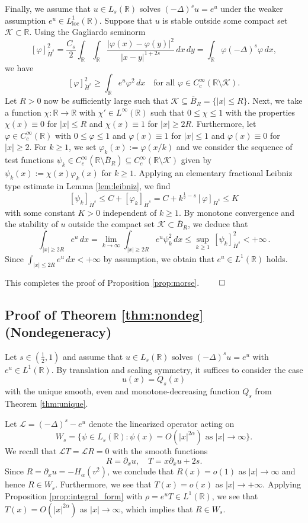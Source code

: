 \documentclass[reqno,10pt,a4paper]{amsart}
\theoremstyle{definition}
\theoremstyle{definition}
\theoremstyle{remark}
\theoremstyle{remark}
\numberwithin{equation}{section}
\newcommand{\R}{\mathbb{R}}
\newcommand{\ov}{\overline}
\newcommand{\pt}{\partial}
\newcommand{\KK}{\mathcal{K}}
\newcommand{\eu}{e}
\newcommand{\Ds}{(-\Delta)^{s}}
\newcommand{\CC}{C}
\renewcommand{\phi}{\varphi}
\newcommand{\Lloc}{L_{\mathrm{loc}}}
\newcommand{\LL}{\mathcal{L}}
\begin{document}
Finally, we assume that $u \in L_s(\R)$ solves $\Ds u = e^u$ under the weaker assumption $e^u \in \Lloc^1(\R)$. Suppose that $u$ is stable outside some compact set $\KK \subset \R$. Using the Gagliardo seminorm 
$$
[\phi]_{\dot{H}^s}^2 = \frac{C_s}{2} \int_{\R} \! \int_\R \frac{|\phi(x)-\phi(y)|^2}{|x-y|^{1+2s} } \, dx \, dy  = \int_\R \phi \Ds \phi \, dx ,
$$
 we have
$$
[\phi]_{\dot{H}^s}^2 \geq \int_{\R} e^u \phi^2 \, dx \quad \mbox{for all $\phi \in C^\infty_c(\R \setminus \KK)$}.
$$ 
Let $R>0$ now be sufficiently large such that $\KK \subseteq \ov{B}_R = \{ |x| \leq R \}$. Next, we take a  function $\chi : \R \to \R$ with $\chi' \in L^\infty(\R)$ such that $0 \leq \chi \leq 1$ with the properties $\chi(x) \equiv 0$  for $|x| \leq R$ and $\chi(x) \equiv 1$ for $|x| \geq 2 R$. Furthermore, let $\phi \in \CC^\infty_c(\R)$ with $0 \leq \phi \leq 1$ and $\phi(x) \equiv 1$ for $|x| \leq 1$ and $\phi(x) \equiv 0$ for $|x| \geq 2$. For $k \geq 1$, we set $\phi_k(x) := \phi(x/k)$ and we consider the sequence of test functions $\psi_k \in \CC^\infty_c(\R \setminus \ov{B}_R) \subseteq \CC^\infty_c(\R \setminus \KK)$ given by
$\psi_k(x) := \chi(x) \phi_k(x)$ for $k \geq 1$. Applying an elementary fractional Leibniz type estimate in Lemma \ref{lem:leibniz}, we find
$$
[\psi_k]_{\dot{H}^s} \leq C + [\phi_k]_{\dot{H}^s} = C + k^{\frac{1}{2}-s} [\phi]_{\dot{H}^s} \leq K
$$
with some constant $K>0$ independent of $k \geq 1$. By monotone convergence and the stability of $u$ outside the compact set $\KK \subset \ov{B}_R$, we deduce that
$$
\int_{|x| \geq 2R} \eu^u \, dx = \lim_{k \to \infty} \int_{|x| \geq 2R} \eu^u \psi_k^2 \, d x \leq \sup_{k \geq 1} \, [\psi_k]_{\dot{H}^s}^2 < +\infty \, .
$$ 
Since  $\int_{|x| \leq 2R} \eu^u \, dx < +\infty$ by assumption, we obtain that $\eu^u \in L^1(\R)$ holds.

This completes the proof of Proposition \ref{prop:morse}. \hfill $\qed$

\subsection{Proof of Theorem \ref{thm:nondeg} (Nondegeneracy)}

Let $s \in (\frac 1 2,1)$ and assume that $u \in L_s(\R)$ solves $\Ds u = e^u$ with $e^u \in L^1(\R)$. By translation and scaling symmetry, it suffices to consider the case
$$
u(x) = Q_s(x) 
$$ 
with the unique smooth, even and monotone-decreasing function $Q_s$ from Theorem \ref{thm:unique}. 

Let $\LL = \Ds - e^u$ denote the linearized operator acting on 
$$
W_s = \{ \psi \in L_s(\R) : \mbox{$\psi(x) = O(|x|^{2 \alpha})$ as $|x| \to \infty$} \}.
$$ 
We recall that $\LL T = \LL R = 0$ with the smooth functions
$$
R = \pt_x u, \quad T = x \pt_x u + 2s.
$$
Since $R= \pt_x u= -H_\alpha(v^2)$, we conclude that $R(x) = o(1)$ as $|x| \to \infty$ and hence $R \in W_s$. Furthermore, we see that $T(x) = o(x)$ as $|x| \to +\infty$. Applying Proposition \ref{prop:integral_form} with $\rho = e^u T \in L^1(\R)$, we see that $T(x) = O(|x|^{2 \alpha})$ as $|x| \to \infty$, which implies that $R \in W_s$.
\end{document}
